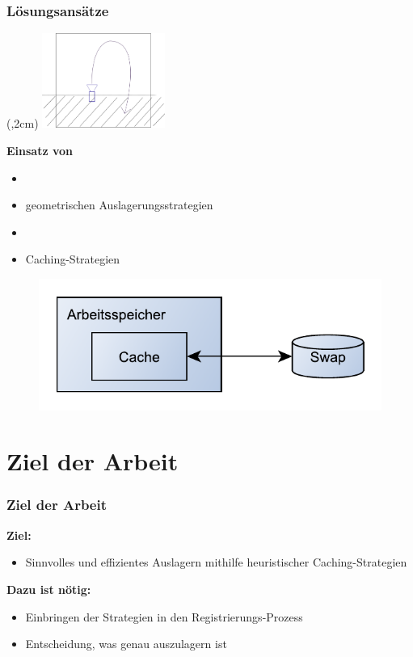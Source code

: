 \documentclass[presentation]{beamer}
\begin{document}
\begin{frame}
\frametitle{Lösungsansätze}
\begin{textblock*}{4cm}(\paperwidth-4.8cm,2cm) %
	\includegraphics[width=4cm,keepaspectratio]{figures/introduction/mot1}
\end{textblock*}
\baselineskip
\color{dd-gray} \textbf{Einsatz von } \color{black} 
\begin{itemize}
	\item[]
	\item geometrischen Auslagerungsstrategien
	\item[]
	\item Caching-Strategien %
\end{itemize}
\vspace{0.3cm}
\begin{figure}
\includegraphics[width=0.7\linewidth]{figures/cache_concept}
\end{figure} 
\baselineskip
\end{frame}

\section{Ziel der Arbeit}
\begin{frame}
	\frametitle{Ziel der Arbeit} %
	\color{dd-gray} \textbf{Ziel:} \color{black} 
	\begin{itemize}
	\item Sinnvolles und effizientes Auslagern mithilfe heuristischer Caching-Strategien
	\end{itemize}
	\vspace{0.3cm}
	\color{dd-gray} \textbf{Dazu ist nötig:} \color{black} 
	\begin{itemize} 
	\item Einbringen der Strategien in den Registrierungs-Prozess  %
	\item Entscheidung, was genau auszulagern ist
	\end{itemize}
\end{frame}
\end{document}
